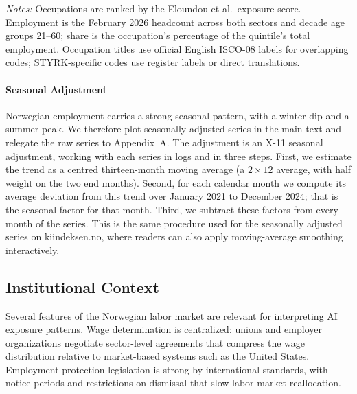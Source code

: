 \documentclass[12pt]{article}
\begin{document}
\begin{table}[htbp]
\centering
\caption{Five largest occupations by AI-exposure quintile, February 2026.}
\label{tab:quintile_top_occ}
\footnotesize

\begin{minipage}{\textwidth}\footnotesize\textit{Notes:} Occupations are ranked by the Eloundou et al.\ exposure score. Employment is the February 2026 headcount across both sectors and decade age groups 21--60; share is the occupation's percentage of the quintile's total employment. Occupation titles use official English ISCO-08 labels for overlapping codes; STYRK-specific codes use register labels or direct translations.\end{minipage}
\end{table}


\paragraph{Seasonal Adjustment}

Norwegian employment carries a strong seasonal pattern, with a winter dip and a summer peak. We therefore plot seasonally adjusted series in the main text and relegate the raw series to Appendix~A. The adjustment is an X-11 seasonal adjustment, working with each series in logs and in three steps. First, we estimate the trend as a centred thirteen-month moving average (a $2\times12$ average, with half weight on the two end months). Second, for each calendar month we compute its average deviation from this trend over January 2021 to December 2024; that is the seasonal factor for that month. Third, we subtract these factors from every month of the series. This is the same procedure used for the seasonally adjusted series on kiindeksen.no, where readers can also apply moving-average smoothing interactively.


\subsection{Institutional Context}\label{sec:data:institutions}

Several features of the Norwegian labor market are relevant for interpreting AI exposure patterns. Wage determination is centralized: unions and employer organizations negotiate sector-level agreements that compress the wage distribution relative to market-based systems such as the United States. Employment protection legislation is strong by international standards, with notice periods and restrictions on dismissal that slow labor market reallocation.
\end{document}
